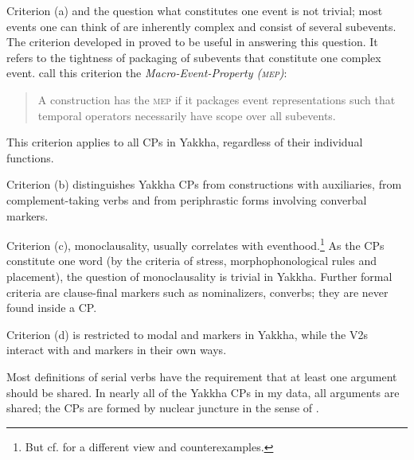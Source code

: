 Criterion (a) and the question what constitutes one event is not trivial; most events one can think of are inherently complex and consist of several subevents. The criterion developed in \citet{Bohnemeyeretal2007_Principles} proved to be  useful in answering this question. It refers to the tightness of packaging of subevents that constitute one complex event. \citet{Bohnemeyeretal2007_Principles}  call this criterion the \emph{Macro-Event-Property (\textsc{mep})}: 
\begin{quote}
A construction has the 	\textsc{mep} if it packages event representations such that temporal operators necessarily have scope over all subevents. \citep[504--5]{Bohnemeyeretal2007_Principles}
\end{quote}

This criterion applies to all CPs in Yakkha, regardless of their individual functions. 

Criterion (b) distinguishes Yakkha CPs from  constructions with auxiliaries, from complement-taking verbs and from periphrastic  forms involving converbal markers. 

Criterion (c), monoclausality,  usually correlates with eventhood.\footnote{But cf. \citet{Foley2010_Events} for a different view and counterexamples.} As the CPs constitute one word (by the criteria of stress, morphophonological rules and  placement), the question of monoclausality is trivial in Yakkha. Further formal criteria are clause-final markers such as  nominalizers, converbs; they are never found inside a CP.  

Criterion (d) is restricted to modal and  markers in Yakkha, while the V2s interact with  and  markers in their own ways. 

Most definitions of serial verbs have the requirement that at least one argument should be shared. In nearly all of the Yakkha CPs in my data, all arguments are shared; the CPs are formed by nuclear juncture in the sense of \citet[190]{Foleyetal1984Functional}. 

